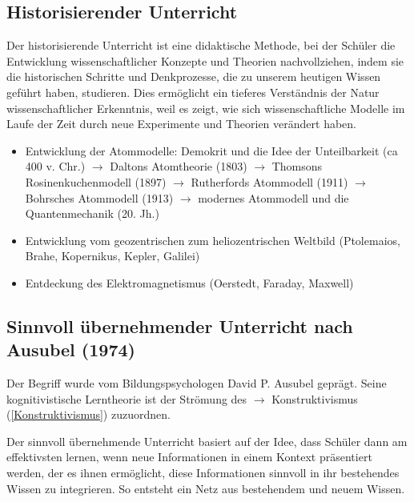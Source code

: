 \bip\bip
\subsection{Historisierender Unterricht}

Der historisierende Unterricht ist eine didaktische Methode, bei der Sch\"{u}ler
die Entwicklung wissenschaftlicher Konzepte und Theorien nachvollziehen, indem sie die historischen Schritte und Denkprozesse, die zu unserem heutigen Wissen gef\"{u}hrt haben, studieren. Dies erm\"{o}glicht ein tieferes Verständnis der Natur wissenschaftlicher Erkenntnis, weil es zeigt, wie sich wissenschaftliche Modelle im Laufe der Zeit durch neue Experimente und Theorien verändert haben.
\mip
\begin{beisp2}
	\begin{itemize}
		\item Entwicklung der Atommodelle: Demokrit und die Idee der Unteilbarkeit (ca 400 v. Chr.) $\to$ Daltons Atomtheorie (1803) $\to$ Thomsons {\glqq}Rosinenkuchenmodell{\grqq} (1897) $\to$ Rutherfords Atommodell (1911) $\to$ Bohrsches Atommodell (1913) $\to$ modernes Atommodell und die Quantenmechanik (20. Jh.)
		\item Entwicklung vom geozentrischen zum heliozentrischen Weltbild (Ptolemaios, Brahe, Kopernikus, Kepler, Galilei)
		\item Entdeckung des Elektromagnetismus (Oerstedt, Faraday, Maxwell)
	\end{itemize}
	
\end{beisp2}

\subsection{Sinnvoll \"{u}bernehmender Unterricht nach Ausubel (1974)}

Der Begriff  wurde vom Bildungspsychologen David P. Ausubel geprägt. Seine kognitivistische Lerntheorie ist der Strömung des $\to$ Konstruktivismus (\cref{Konstruktivismus}) zuzuordnen. 

\bip
Der sinnvoll übernehmende Unterricht basiert auf der Idee, dass Schüler dann am effektivsten lernen, wenn neue Informationen in einem Kontext präsentiert werden, der es ihnen ermöglicht, diese Informationen sinnvoll in ihr bestehendes Wissen zu integrieren. So entsteht ein Netz aus bestehendem und neuem Wissen.

